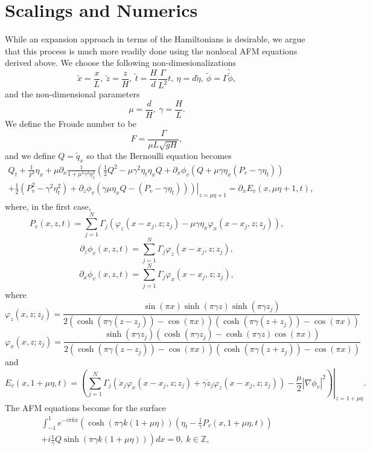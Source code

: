 \documentclass[a4paper,11pt]{article}
\newcommand{\p}{\partial}
\begin{document}
\section*{Scalings and Numerics}
While an expansion approach in terms of the Hamiltonians is desirable, we argue that this process is much more readily done using the nonlocal AFM equations derived above.  We choose the following non-dimesionalizations 
\[
\tilde{x} = \frac{x}{L}, ~\tilde{z} = \frac{z}{H}, ~ \tilde{t} = \frac{H}{d}\frac{\Gamma}{L^{2}} t, ~ \eta = d\tilde{\eta}, ~ \tilde{\phi} = \Gamma \tilde{\tilde{\phi}},
\]
and the non-dimensional parameters
\[
\mu= \frac{d}{H}, ~ \gamma = \frac{H}{L}.
\]
We define the Froude number to be 
\[
F = \frac{\Gamma}{\mu L \sqrt{gH}},
\]
and we define $Q = \tilde{q}_{x}$ so that the Bernoulli equation becomes 
\begin{align*}
Q_{t} + \frac{1}{F^{2}}\eta_{x} + \mu\p_{x}\frac{1}{1+ \mu^{2}\gamma^{2}\eta_{x}^{2}} \left( \frac{1}{2}Q^{2} - \mu \gamma^{2}\eta_{t}\eta_{x}Q  +  \p_{x}\phi_{v} (Q + \mu\gamma\eta_{x}( P_{v}-\gamma\eta_{t}))   \right. \\
\left.\left. + \frac{1}{2}\left(P_{v}^{2}-\gamma^{2}\eta_{t}^{2} \right)+ \p_{z}\phi_{v}\left(\gamma \mu \eta_{x}Q-\left(P_{v}-\gamma \eta_{t}\right) \right) \right)\right|_{z=\mu\eta+1}= \p_{x}E_{v}(x,\mu\eta+1,t),
\end{align*}
where, in the first case,
\[
P_{v}(x,z,t) = \sum_{j=1}^{N} \Gamma_{j} \left(\varphi_{z}(x-x_{j},z;z_{j})-\mu\gamma \eta_{x}\varphi_{x}(x-x_{j},z;z_{j}) \right),
\]
\[
\p_{z}\phi_{v}(x,z,t) =  \sum_{j=1}^{N} \Gamma_{j}\varphi_{z}(x-x_{j},z;z_{j}),
\]
\[
\p_{x}\phi_{v}(x,z,t) = \sum_{j=1}^{N}\Gamma_{j}\varphi_{x}(x-x_{j},z;z_{j}),
\]
where
\[
\varphi_{z}(x,z;z_{j}) = \frac{\sin(\pi x)\sinh(\pi \gamma z)\sinh(\pi \gamma z_{j})}{2\left(\cosh(\pi\gamma(z-z_{j}))-\cos(\pi x)\right) \left(\cosh(\pi\gamma(z+z_{j}))-\cos(\pi x)\right)}
\]
\[
\varphi_{x}(x,z;z_{j}) = \frac{\sinh(\pi \gamma z_{j})\left(\cosh(\pi \gamma z_{j})-\cosh(\pi \gamma z)\cos(\pi x)\right)}{2\left(\cosh(\pi\gamma(z-z_{j}))-\cos(\pi x)\right) \left(\cosh(\pi\gamma(z+z_{j}))-\cos(\pi x)\right)}
\]
and
\[
E_{v}(x,1+\mu\eta,t) = \left.\left(\sum_{j=1}^{N}\Gamma_{j}\left(\dot{x}_{j}\varphi_{x}(x-x_{j},z;z_{j}) + \gamma\dot{z}_{j}\varphi_{z}(x-x_{j},z;z_{j}) \right) -\frac{\mu}{2}\left|\nabla\phi_{v} \right|^{2}\right)\right|_{z=1+\mu \eta}.
\]
The AFM equations become for the surface 
\begin{align*}
\int_{-1}^{1} e^{-i\pi k x}\left(\cosh\left( \pi\gamma k (1 + \mu \eta)\right)\left(\eta_{t} - \frac{1}{\gamma}P_{v}(x,1+\mu\eta,t) \right) \right.\\
\left.+i  \frac{1}{\gamma}Q\sinh\left(\pi \gamma k (1 + \mu \eta)\right)\right) dx = 0,~k\in\mathbb{Z},
\end{align*}
\end{document}
